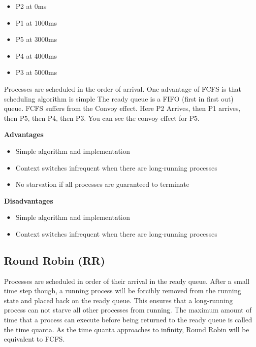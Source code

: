 \begin{itemize}
\tightlist
\item
  P2 at 0ms
\item
  P1 at 1000ms
\item
  P5 at 3000ms
\item
  P4 at 4000ms
\item
  P3 at 5000ms
\end{itemize}

Processes are scheduled in the order of arrival.
One advantage of FCFS is that scheduling algorithm is simple
The ready queue is a FIFO (first in first out) queue.
FCFS suffers from the Convoy effect.
Here P2 Arrives, then P1 arrives, then P5, then P4, then P3. You can see the convoy effect for P5.

\textbf{Advantages}

\begin{itemize}
\item Simple algorithm and implementation
\item Context switches infrequent when there are long-running processes
\item No starvation if all processes are guaranteed to terminate
\end{itemize}

\textbf{Disadvantages}
\begin{itemize}
\item Simple algorithm and implementation
\item Context switches infrequent when there are long-running processes

\end{itemize}

\subsection{Round Robin (RR)}

Processes are scheduled in order of their arrival in the ready queue.
After a small time step though, a running process will be forcibly removed from the running state and placed back on the ready queue.
This ensures that a long-running process can not starve all other processes from running.
The maximum amount of time that a process can execute before being returned to the ready queue is called the time quanta.
As the time quanta approaches to infinity, Round Robin will be equivalent to FCFS.

